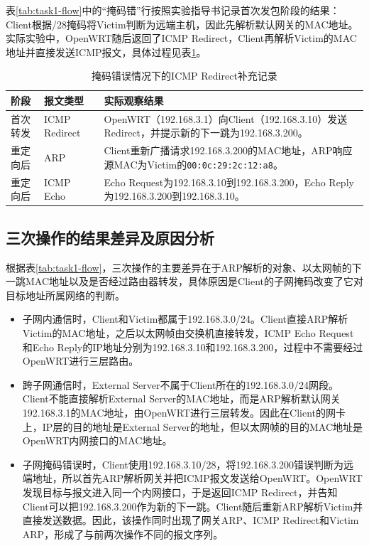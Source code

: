 表\ref{tab:task1-flow}中的“掩码错”行按照实验指导书记录首次发包阶段的结果：Client根据/28掩码将Victim判断为远端主机，因此先解析默认网关的MAC地址。实际实验中，OpenWRT随后返回了ICMP Redirect，Client再解析Victim的MAC地址并直接发送ICMP报文，具体过程见表\ref{tab:task1-redirect}。

\begin{table}[H]
    \centering
    \caption{掩码错误情况下的ICMP Redirect补充记录}
    \label{tab:task1-redirect}
    \small
    \renewcommand{\arraystretch}{1.35}
    \begin{tabularx}{\linewidth}{>{\raggedright\arraybackslash}p{2.5cm} >{\raggedright\arraybackslash}p{3.5cm} >{\raggedright\arraybackslash}X}
        \toprule
        阶段 & 报文类型 & 实际观察结果 \\
        \midrule
        首次转发 & ICMP Redirect & OpenWRT（192.168.3.1）向Client（192.168.3.10）发送Redirect，并提示新的下一跳为192.168.3.200。 \\
        重定向后 & ARP & Client重新广播请求192.168.3.200的MAC地址，ARP响应源MAC为Victim的\texttt{00:0c:29:2c:12:a8}。 \\
        重定向后 & ICMP Echo & Echo Request为192.168.3.10到192.168.3.200，Echo Reply为192.168.3.200到192.168.3.10。 \\
        \bottomrule
    \end{tabularx}
\end{table}

\subsection{三次操作的结果差异及原因分析}

根据表\ref{tab:task1-flow}，三次操作的主要差异在于ARP解析的对象、以太网帧的下一跳MAC地址以及是否经过路由器转发，具体原因是Client的子网掩码改变了它对目标地址所属网络的判断。

\begin{itemize}
    \item 子网内通信时，Client和Victim都属于192.168.3.0/24。Client直接ARP解析Victim的MAC地址，之后以太网帧由交换机直接转发，ICMP Echo Request和Echo Reply的IP地址分别为192.168.3.10和192.168.3.200，过程中不需要经过OpenWRT进行三层路由。
    \item 跨子网通信时，External Server不属于Client所在的192.168.3.0/24网段。Client不能直接解析External Server的MAC地址，而是ARP解析默认网关192.168.3.1的MAC地址，由OpenWRT进行三层转发。因此在Client的网卡上，IP层的目的地址是External Server的地址，但以太网帧的目的MAC地址是OpenWRT内网接口的MAC地址。
    \item 子网掩码错误时，Client使用192.168.3.10/28，将192.168.3.200错误判断为远端地址，所以首先ARP解析网关并把ICMP报文发送给OpenWRT。OpenWRT发现目标与报文进入同一个内网接口，于是返回ICMP Redirect，并告知Client可以把192.168.3.200作为新的下一跳。Client随后重新ARP解析Victim并直接发送数据。因此，该操作同时出现了网关ARP、ICMP Redirect和Victim ARP，形成了与前两次操作不同的报文序列。
\end{itemize}

